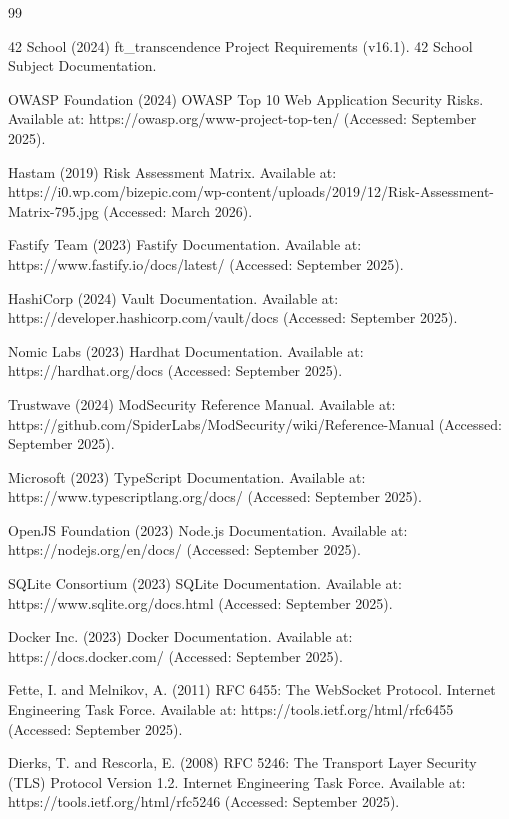 \documentclass[11pt,a4paper]{report}
\begin{document}
\raggedright
\begin{thebibliography}{99}

42 School (2024) ft\_transcendence Project Requirements (v16.1). 42 School Subject Documentation.

OWASP Foundation (2024) OWASP Top 10 Web Application Security Risks. Available at: https://owasp.org/www-project-top-ten/ (Accessed: September 2025).

Hastam (2019) Risk Assessment Matrix. Available at: https://i0.wp.com/bizepic.com/wp-content/uploads/2019/12/Risk-Assessment-Matrix-795.jpg (Accessed: March 2026).

Fastify Team (2023) Fastify Documentation. Available at: https://www.fastify.io/docs/latest/ (Accessed: September 2025).

HashiCorp (2024) Vault Documentation. Available at: https://developer.hashicorp.com/vault/docs (Accessed: September 2025).

Nomic Labs (2023) Hardhat Documentation. Available at: https://hardhat.org/docs (Accessed: September 2025).

Trustwave (2024) ModSecurity Reference Manual. Available at: https://github.com/SpiderLabs/ModSecurity/wiki/Reference-Manual (Accessed: September 2025).

Microsoft (2023) TypeScript Documentation. Available at: https://www.typescriptlang.org/docs/ (Accessed: September 2025).

OpenJS Foundation (2023) Node.js Documentation. Available at: https://nodejs.org/en/docs/ (Accessed: September 2025).

SQLite Consortium (2023) SQLite Documentation. Available at: https://www.sqlite.org/docs.html (Accessed: September 2025).

Docker Inc. (2023) Docker Documentation. Available at: https://docs.docker.com/ (Accessed: September 2025).

Fette, I. and Melnikov, A. (2011) RFC 6455: The WebSocket Protocol. Internet Engineering Task Force. Available at: https://tools.ietf.org/html/rfc6455 (Accessed: September 2025).

Dierks, T. and Rescorla, E. (2008) RFC 5246: The Transport Layer Security (TLS) Protocol Version 1.2. Internet Engineering Task Force. Available at: https://tools.ietf.org/html/rfc5246 (Accessed: September 2025).

\end{thebibliography}
\end{document}
